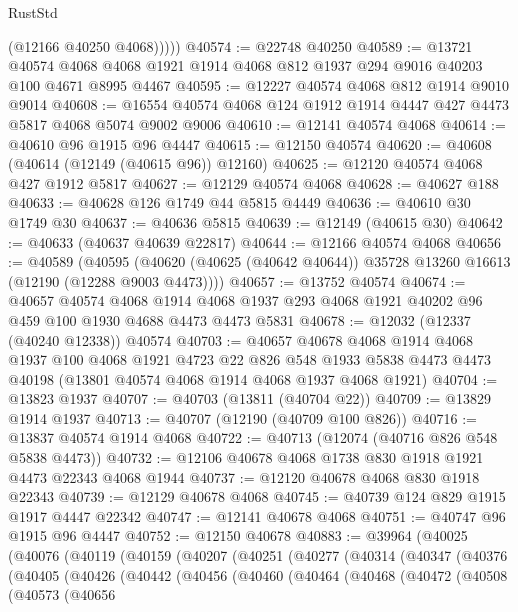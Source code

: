 \begin{lexlean}{RustStd}
\begin{coremodule}
            (@12166 @40250 @4068)))))
@40574 := @22748 @40250
@40589 := @13721
    @40574
    @4068
    @4068
    @1921
    @1914
    @4068
    @812
    @1937
    @294
    @9016
    @40203
    @100
    @4671
    @8995
    @4467
@40595 := @12227 @40574 @4068 @812 @1914 @9010 @9014
@40608 := @16554 @40574 @4068 @124 @1912 @1914 @4447 @427 @4473 @5817 @4068 @5074 @9002 @9006
@40610 := @12141 @40574 @4068
@40614 := @40610 @96 @1915 @96 @4447
@40615 := @12150 @40574
@40620 := @40608 (@40614 (@12149 (@40615 @96)) @12160)
@40625 := @12120 @40574 @4068 @427 @1912 @5817
@40627 := @12129 @40574 @4068
@40628 := @40627 @188
@40633 := @40628 @126 @1749 @44 @5815 @4449
@40636 := @40610 @30 @1749 @30
@40637 := @40636 @5815
@40639 := @12149 (@40615 @30)
@40642 := @40633 (@40637 @40639 @22817)
@40644 := @12166 @40574 @4068
@40656 := @40589
    (@40595 (@40620 (@40625 (@40642 @40644)) @35728 @13260 @16613 (@12190 (@12288 @9003 @4473))))
@40657 := @13752 @40574
@40674 := @40657
    @40574
    @4068
    @1914
    @4068
    @1937
    @293
    @4068
    @1921
    @40202
    @96
    @459
    @100
    @1930
    @4688
    @4473
    @4473
    @5831
@40678 := @12032 (@12337 (@40240 @12338)) @40574
@40703 := @40657
    @40678
    @4068
    @1914
    @4068
    @1937
    @100
    @4068
    @1921
    @4723
    @22
    @826
    @548
    @1933
    @5838
    @4473
    @4473
    @40198
    (@13801 @40574 @4068 @1914 @4068 @1937 @4068 @1921)
@40704 := @13823 @1937
@40707 := @40703 (@13811 (@40704 @22))
@40709 := @13829 @1914 @1937
@40713 := @40707 (@12190 (@40709 @100 @826))
@40716 := @13837 @40574 @1914 @4068
@40722 := @40713 (@12074 (@40716 @826 @548 @5838 @4473))
@40732 := @12106 @40678 @4068 @1738 @830 @1918 @1921 @4473 @22343 @4068 @1944
@40737 := @12120 @40678 @4068 @830 @1918 @22343
@40739 := @12129 @40678 @4068
@40745 := @40739 @124 @829 @1915 @1917 @4447 @22342
@40747 := @12141 @40678 @4068
@40751 := @40747 @96 @1915 @96 @4447
@40752 := @12150 @40678
@40883 := @39964
    (@40025
      (@40076
        (@40119
          (@40159
            (@40207
              (@40251
                (@40277
                  (@40314
                    (@40347
                      (@40376
                        (@40405
                          (@40426
                            (@40442
                              (@40456
                                (@40460
                                  (@40464
                                    (@40468
                                      (@40472
                                        (@40508
                                          (@40573
                                            (@40656

\end{coremodule}
\end{lexlean}
